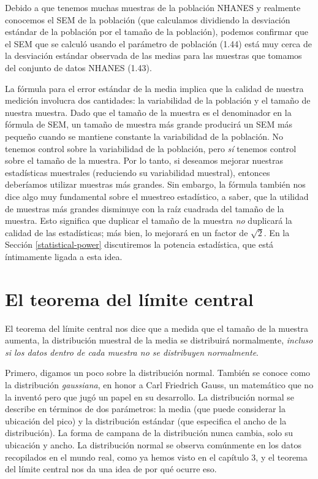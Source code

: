 \documentclass[
  12pt,
]{book}
\begin{document}
Debido a que tenemos muchas muestras de la población NHANES y realmente conocemos el SEM de la población (que calculamos dividiendo la desviación estándar de la población por el tamaño de la población), podemos confirmar que el SEM que se calculó usando el parámetro de población (1.44) está muy cerca de la desviación estándar observada de las medias para las muestras que tomamos del conjunto de datos NHANES (1.43).

La fórmula para el error estándar de la media implica que la calidad de nuestra medición involucra dos cantidades: la variabilidad de la población y el tamaño de nuestra muestra. Dado que el tamaño de la muestra es el denominador en la fórmula de SEM, un tamaño de muestra más grande producirá un SEM más pequeño cuando se mantiene constante la variabilidad de la población. No tenemos control sobre la variabilidad de la población, pero \emph{sí} tenemos control sobre el tamaño de la muestra. Por lo tanto, si deseamos mejorar nuestras estadísticas muestrales (reduciendo su variabilidad muestral), entonces deberíamos utilizar muestras más grandes. Sin embargo, la fórmula también nos dice algo muy fundamental sobre el muestreo estadístico, a saber, que la utilidad de muestras más grandes disminuye con la raíz cuadrada del tamaño de la muestra. Esto significa que duplicar el tamaño de la muestra \emph{no} duplicará la calidad de las estadísticas; más bien, lo mejorará en un factor de \(\sqrt{2}\). En la Sección \ref{statistical-power} discutiremos la potencia estadística, que está íntimamente ligada a esta idea.

\hypertarget{the-central-limit-theorem}{%
\section{El teorema del límite central}\label{the-central-limit-theorem}}

El teorema del límite central nos dice que a medida que el tamaño de la muestra aumenta, la distribución muestral de la media se distribuirá normalmente, \emph{incluso si los datos dentro de cada muestra no se distribuyen normalmente}.

Primero, digamos un poco sobre la distribución normal. También se conoce como la distribución \emph{gaussiana}, en honor a Carl Friedrich Gauss, un matemático que no la inventó pero que jugó un papel en su desarrollo. La distribución normal se describe en términos de dos parámetros: la media (que puede considerar la ubicación del pico) y la distribución estándar (que especifica el ancho de la distribución). La forma de campana de la distribución nunca cambia, solo su ubicación y ancho. La distribución normal se observa comúnmente en los datos recopilados en el mundo real, como ya hemos visto en el capítulo 3, y el teorema del límite central nos da una idea de por qué ocurre eso.
\end{document}

